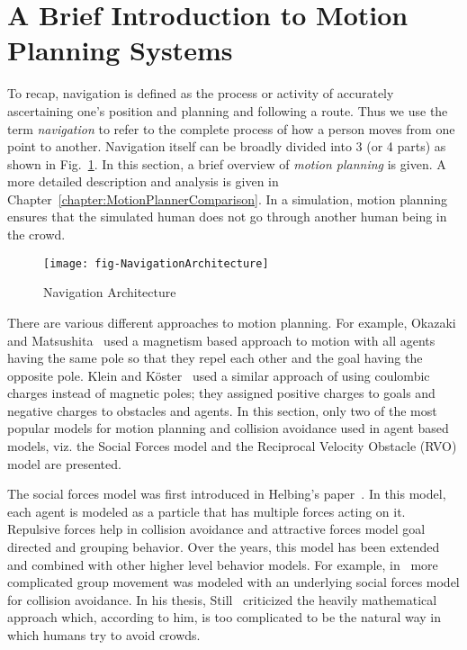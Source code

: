\section{A Brief Introduction to Motion Planning Systems}
\label{IBP:MotionPlanning}

To recap, navigation is defined as the process or activity of accurately ascertaining one's position and planning and following a route. Thus we use the term \emph{navigation} to refer to the complete process of how a person moves from one point to another. Navigation itself can be broadly divided into 3 (or 4 parts) as shown in Fig.~\ref{fig:NavigationArchitecture}. In this section, a brief overview of \emph{motion planning} is given. A more detailed description and analysis is given in Chapter~\ref{chapter:MotionPlannerComparison}. In a simulation, motion planning ensures that the simulated human does not go through another human being in the crowd.

\begin{figure}[!tb]
\centering
\texttt{[image: fig-NavigationArchitecture]}
\caption{Navigation Architecture}
\label{fig:NavigationArchitecture}
\end{figure}

There are various different approaches to motion planning. For example,  Okazaki and Matsushita~\cite{Okazaki:1993wh} used a magnetism based approach to motion with all agents having the same pole so that they repel each other and the goal having the opposite pole. Klein and K\"oster~\cite{Klein:2009} used a similar approach of using coulombic charges instead of magnetic poles; they assigned positive charges to goals and negative charges to obstacles and agents. In this section, only two of the most popular models for motion planning and collision avoidance used in agent based models, viz. the Social Forces model and the Reciprocal Velocity Obstacle (RVO) model are presented.

The social forces model was first introduced in Helbing's paper~\cite{Helbing:1995ie}. In this model, each agent is modeled as a particle that has multiple forces acting on it. Repulsive forces help in collision avoidance and attractive forces model goal directed and grouping behavior. Over the years, this model has been extended and combined with other higher level behavior models. For example, in~\cite{Kamphuis:2004uu} more complicated group movement was modeled with an underlying social forces model for collision avoidance. In his thesis, Still~\cite{Still:2000tp} criticized the heavily mathematical approach which, according to him, is too complicated to be the natural way in which humans try to avoid crowds.

